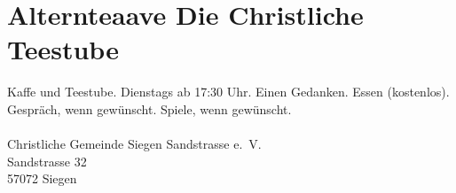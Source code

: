 \section{Alternteaave Die Christliche Teestube}
Kaffe und Teestube. Dienstags ab 17:30 Uhr. Einen Gedanken. Essen (kostenlos). Gespräch, wenn gewünscht. Spiele, wenn gewünscht.\\
\\
Christliche Gemeinde Siegen Sandstrasse e.~V.\\
Sandstrasse 32\\
57072 Siegen